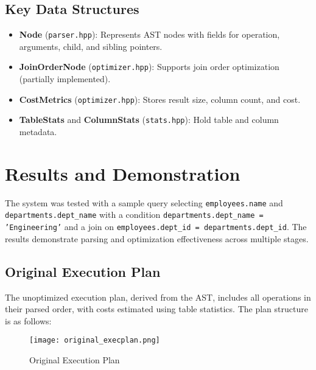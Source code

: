\documentclass[12pt,a4paper]{article}
\begin{document}
\subsection{Key Data Structures}
\begin{itemize}
    \item \textbf{Node} (\texttt{parser.hpp}): Represents AST nodes with fields for operation, arguments, child, and sibling pointers.
    \item \textbf{JoinOrderNode} (\texttt{optimizer.hpp}): Supports join order optimization (partially implemented).
    \item \textbf{CostMetrics} (\texttt{optimizer.hpp}): Stores result size, column count, and cost.
    \item \textbf{TableStats} and \textbf{ColumnStats} (\texttt{stats.hpp}): Hold table and column metadata.
\end{itemize}

\section{Results and Demonstration}
The system was tested with a sample query selecting \texttt{employees.name} and \texttt{departments.dept\_name} with a condition \texttt{departments.dept\_name = 'Engineering'} and a join on \texttt{employees.dept\_id = departments.dept\_id}. The results demonstrate parsing and optimization effectiveness across multiple stages.

\newpage
\subsection{Original Execution Plan}
The unoptimized execution plan, derived from the AST, includes all operations in their parsed order, with costs estimated using table statistics. The plan structure is as follows:



\begin{figure}[H]
    \centering
    \texttt{[image: original\_execplan.png]}
    \caption{Original Execution Plan}
    \label{fig:original_execplan}
\end{figure}
\end{document}
